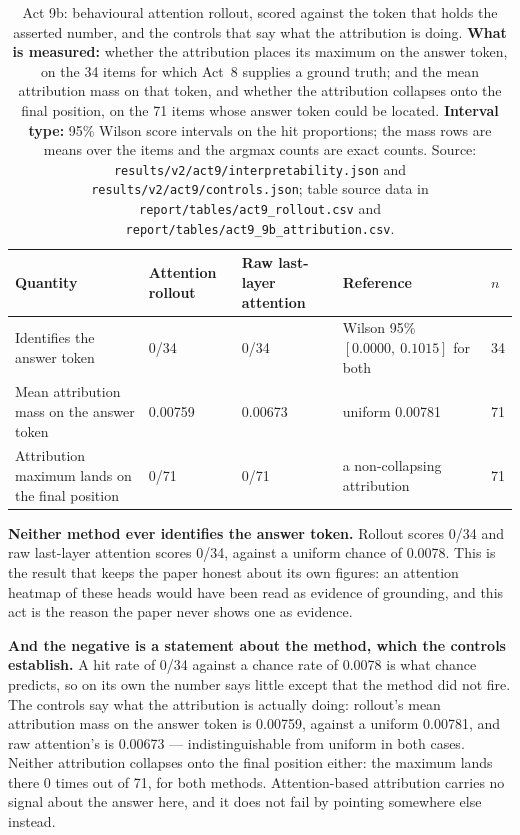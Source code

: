 \documentclass[11pt,a4paper]{article}
\begin{document}
\begin{table}[H]
\centering
\begin{tabular}{L{4.6cm}R{2.4cm}R{2.5cm}L{3.1cm}R{1.1cm}}
\toprule
Quantity & Attention rollout & Raw last-layer attention & Reference & $n$ \\
\midrule
Identifies the answer token & 0/34 & 0/34 & Wilson 95\% $[0.0000,\ 0.1015]$ for both & 34 \\
Mean attribution mass on the answer token & 0.00759 & 0.00673 & uniform 0.00781 & 71 \\
Attribution maximum lands on the final position & 0/71 & 0/71 & a non-collapsing attribution & 71 \\
\bottomrule
\end{tabular}
\caption{Act 9b: behavioural attention rollout, scored against the token that
holds the asserted number, and the controls that say what the attribution is
doing. \textbf{What is measured:} whether the attribution places its maximum
on the answer token, on the 34 items for which Act~8 supplies a ground truth;
and the mean attribution mass on that token, and whether the attribution
collapses onto the final position, on the 71 items whose answer token could
be located. \textbf{Interval type:} 95\% Wilson score intervals on the hit
proportions; the mass rows are means over the items and the argmax counts are
exact counts. Source: \texttt{results/v2/act9/interpretability.json} and
\texttt{results/v2/act9/controls.json}; table source data in
\texttt{report/tables/act9\_rollout.csv} and
\texttt{report/tables/act9\_9b\_attribution.csv}.}
\label{tab:act9b}
\end{table}

\textbf{Neither method ever identifies the answer token.} Rollout scores 0/34
and raw last-layer attention scores 0/34, against a uniform chance of 0.0078.
This is the result that keeps the paper honest about its own figures: an
attention heatmap of these heads would have been read as evidence of
grounding, and this act is the reason the paper never shows one as evidence.

\textbf{And the negative is a statement about the method, which the controls
establish.} A hit rate of 0/34 against a chance rate of 0.0078 is what chance
predicts, so on its own the number says little except that the method did not
fire. The controls say what the attribution is actually doing: rollout's mean
attribution mass on the answer token is 0.00759, against a uniform 0.00781,
and raw attention's is 0.00673 --- indistinguishable from uniform in both
cases. Neither attribution collapses onto the final position either: the
maximum lands there 0 times out of 71, for both methods. Attention-based
attribution carries no signal about the answer here, and it does not fail by
pointing somewhere else instead. %
\end{document}
